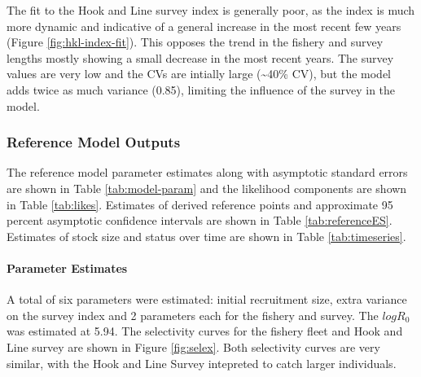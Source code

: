 \documentclass[11pt,
  english,
  a4paper,
]{article}
\begin{document}
The fit to the Hook and Line survey index is generally poor, as the index is much more dynamic and indicative of a general increase in the most recent few years (Figure \ref{fig:hkl-index-fit}). This opposes the trend in the fishery and survey lengths mostly showing a small decrease in the most recent years. The survey values are very low and the CVs are intially large (\textasciitilde40\% CV), but the model adds twice as much variance (0.85), limiting the influence of the survey in the model.

\leavevmode\tagmcend\tagstructend\par


\hypertarget{reference-model-outputs}{%
\subsubsection{Reference Model Outputs}\label{reference-model-outputs}}

\leavevmode\tagmcend\tagstructend


The reference model parameter estimates along with asymptotic standard errors are shown in Table \ref{tab:model-param} and the likelihood components are shown in Table \ref{tab:likes}. Estimates of derived reference points and approximate 95 percent asymptotic confidence intervals are shown in Table \ref{tab:referenceES}. Estimates of stock size and status over time are shown in Table \ref{tab:timeseries}.

\leavevmode\tagmcend\tagstructend\par


\hypertarget{parameter-estimates}{%
\paragraph{Parameter Estimates}\label{parameter-estimates}}

\leavevmode\tagmcend\tagstructend


A total of six parameters were estimated: initial recruitment size, extra variance on the survey index and 2 parameters each for the fishery and survey. The {\(logR_0\)\leavevmode\tagmcend\tagstructend} was estimated at 5.94. The selectivity curves for the fishery fleet and Hook and Line survey are shown in Figure \ref{fig:selex}. Both selectivity curves are very similar, with the Hook and Line Survey intepreted to catch larger individuals.
\end{document}
